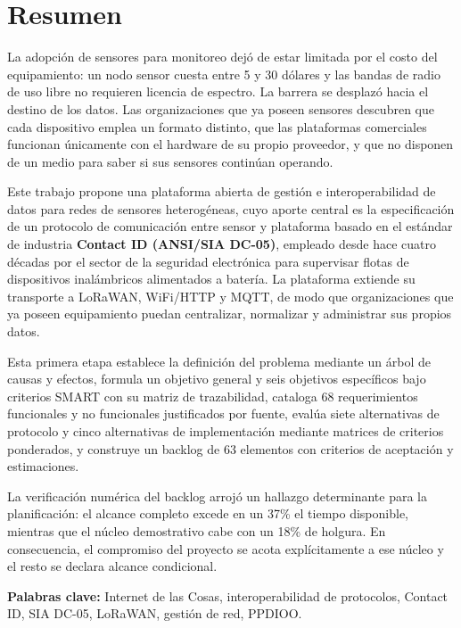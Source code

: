 \section*{Resumen}

La adopción de sensores para monitoreo dejó de estar limitada por el costo del equipamiento: un nodo
sensor cuesta entre 5 y 30 dólares y las bandas de radio de uso libre no requieren licencia de
espectro. La barrera se desplazó hacia el destino de los datos. Las organizaciones que ya poseen
sensores descubren que cada dispositivo emplea un formato distinto, que las plataformas comerciales
funcionan únicamente con el hardware de su propio proveedor, y que no disponen de un medio para saber
si sus sensores continúan operando.

Este trabajo propone una plataforma abierta de gestión e interoperabilidad de datos para redes de
sensores heterogéneas, cuyo aporte central es la especificación de un protocolo de comunicación entre
sensor y plataforma basado en el estándar de industria \textbf{Contact ID (ANSI/SIA DC-05)}, empleado
desde hace cuatro décadas por el sector de la seguridad electrónica para supervisar flotas de
dispositivos inalámbricos alimentados a batería. La plataforma extiende su transporte a LoRaWAN,
WiFi/HTTP y MQTT, de modo que organizaciones que ya poseen equipamiento puedan centralizar, normalizar
y administrar sus propios datos.

Esta primera etapa establece la definición del problema mediante un árbol de causas y efectos, formula
un objetivo general y seis objetivos específicos bajo criterios SMART con su matriz de trazabilidad,
cataloga 68 requerimientos funcionales y no funcionales justificados por fuente, evalúa siete
alternativas de protocolo y cinco alternativas de implementación mediante matrices de criterios
ponderados, y construye un backlog de 63 elementos con criterios de aceptación y estimaciones.

La verificación numérica del backlog arrojó un hallazgo determinante para la planificación: el alcance
completo excede en un 37\% el tiempo disponible, mientras que el núcleo demostrativo cabe con un
18\% de holgura. En consecuencia, el compromiso del proyecto se acota explícitamente a ese núcleo y
el resto se declara alcance condicional.

\vspace{0.6em}
\noindent\textbf{Palabras clave:} Internet de las Cosas, interoperabilidad de protocolos, Contact ID,
SIA DC-05, LoRaWAN, gestión de red, PPDIOO.
